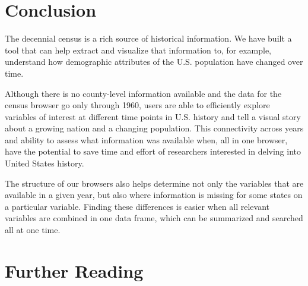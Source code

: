 \documentclass[DIV=calc, paper=a4, fontsize=10pt, twocolumn]{scrartcl}\usepackage[]{graphicx}\usepackage[]{color}
\begin{document}
\section*{Conclusion}
The decennial census is a rich source of historical information. We have built a tool that can help extract and visualize that information to, for example, understand how demographic attributes of the U.S. population have changed over time.

Although there is no county-level information available and the data for the census browser go only through 1960, users are able to efficiently explore variables of interest at different time points in U.S. history and tell a visual story about a growing nation and a changing population. This connectivity across years and ability to assess what information was available when, all in one browser, have the potential to save time and effort of researchers interested in delving into United States history.

The structure of our browsers also helps determine not only the variables that are available in a given year, but also where information is missing for some states on a particular variable. Finding these differences is easier when all relevant variables are combined in one data frame, which can be summarized and searched all at one time.


\section*{Further Reading}


\end{document}
